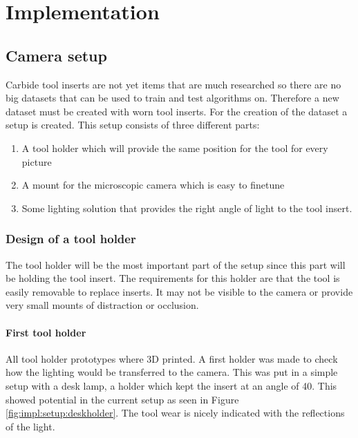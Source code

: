  
\chapter{Implementation}


\section{Camera setup}
Carbide tool inserts are not yet items that are much researched so there are no big datasets that can be used to train and test algorithms on. Therefore a new dataset must be created with worn tool inserts. For the creation of the dataset a setup is created. This setup consists of three different parts:
\begin{enumerate}
\item A tool holder which will provide the same position for the tool for every picture
\item A mount for the microscopic camera which is easy to finetune
\item Some lighting solution that provides the right angle of light to the tool insert.
\end{enumerate}

	\subsection{Design of a tool holder}
	The tool holder will be the most important part of the setup since this part will be holding the tool insert. The requirements for this holder are that the tool is easily removable to replace inserts. It may not be visible to the camera or provide very small mounts of distraction or occlusion.
	
	
	\subsubsection{First tool holder}
	All tool holder prototypes where 3D printed. A first holder was made to check how the lighting would be transferred to the camera. This was put in a simple setup with a desk lamp, a holder which kept the insert at an angle of 40\textdegree. This showed potential in the current setup as seen in Figure \ref{fig:impl:setup:deskholder}. The tool wear is nicely indicated with the reflections of the light. 
	
